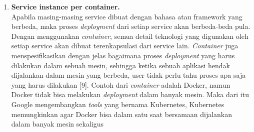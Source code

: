 \begin{enumerate}[leftmargin=*]
\begin{adjustbox}{width=1\textwidth}
	\centering
	\begin{minipage}{\linewidth}
	\end{minipage}
\end{adjustbox}\\
	\item \textbf{Service instance per container.}\\
	Apabila masing-masing service dibuat dengan bahasa atau framework yang berbeda, maka proses \textit{deployment} dari setiap service akan berbeda-beda pula. Dengan menggunakan \textit{container}, semua detail teknologi yang digunakan oleh setiap service akan dibuat terenkapsulasi dari service lain. \textit{Container} juga menspesifikasikan dengan jelas bagaimana proses \textit{deployment} yang harus dilakukan dalam sebuah mesin, sehingga ketika sebuah aplikasi hendak dijalankan dalam mesin yang berbeda, user tidak perlu tahu proses apa saja yang harus dilakukan [9].  Contoh dari \textit{container} adalah Docker, namun Docker tidak bisa melakukan \textit{deployment} dalam banyak mesin. Maka dari itu Google mengembangkan \textit{tools} yang bernama Kubernetes, Kubernetes memungkinkan agar Docker bisa dalam satu saat bersamaan dijalankan dalam banyak mesin sekaligus \cite{9}
	

\end{enumerate}
